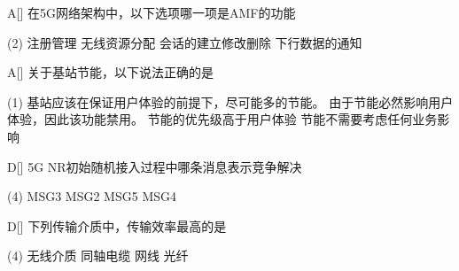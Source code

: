 \begin{choice}{A}[]
	在5G网络架构中，以下选项哪一项是AMF的功能
	\begin{tasks}(2)
		\task 注册管理
		\task 无线资源分配
		\task 会话的建立修改删除
		\task 下行数据的通知
	\end{tasks}
\end{choice}


\begin{choice}{A}[]
	关于基站节能，以下说法正确的是
	\begin{tasks}(1)
		\task 基站应该在保证用户体验的前提下，尽可能多的节能。
		\task 由于节能必然影响用户体验，因此该功能禁用。
		\task 节能的优先级高于用户体验
		\task 节能不需要考虑任何业务影响
	\end{tasks}
\end{choice}


\begin{choice}{D}[]
	5G NR初始随机接入过程中哪条消息表示竞争解决
	\begin{tasks}(4)
		\task MSG3
		\task MSG2
		\task MSG5
		\task MSG4
	\end{tasks}
\end{choice}

\begin{choice}{D}[]
	下列传输介质中，传输效率最高的是
	\begin{tasks}(4)
		\task 无线介质
		\task 同轴电缆
		\task 网线
		\task 光纤
	\end{tasks}
\end{choice}


